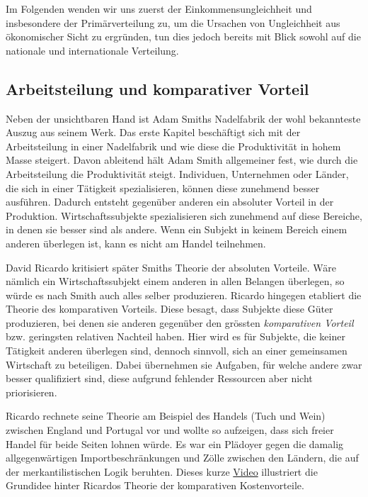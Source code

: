 \documentclass[
  nswissgerman,
  a4paper,
  DIV=11,
  numbers=noendperiod,
  oneside,
  openany]{scrreprt}
\begin{document}
Im Folgenden wenden wir uns zuerst der Einkommensungleichheit und
insbesondere der Primärverteilung zu, um die Ursachen von Ungleichheit
aus ökonomischer Sicht zu ergründen, tun dies jedoch bereits mit Blick
sowohl auf die nationale und internationale Verteilung.

\subsection{Arbeitsteilung und komparativer
Vorteil}\label{arbeitsteilung-und-komparativer-vorteil}

Neben der unsichtbaren Hand ist Adam Smiths Nadelfabrik der wohl
bekannteste Auszug aus seinem Werk. Das erste Kapitel beschäftigt sich
mit der Arbeitsteilung in einer Nadelfabrik und wie diese die
Produktivität in hohem Masse steigert. Davon ableitend hält Adam Smith
allgemeiner fest, wie durch die Arbeitsteilung die Produktivität steigt.
Individuen, Unternehmen oder Länder, die sich in einer Tätigkeit
spezialisieren, können diese zunehmend besser ausführen. Dadurch
entsteht gegenüber anderen ein absoluter Vorteil in der Produktion.
Wirtschaftssubjekte spezialisieren sich zunehmend auf diese Bereiche, in
denen sie besser sind als andere. Wenn ein Subjekt in keinem Bereich
einem anderen überlegen ist, kann es nicht am Handel teilnehmen.

David Ricardo kritisiert später Smiths Theorie der absoluten Vorteile.
Wäre nämlich ein Wirtschaftssubjekt einem anderen in allen Belangen
überlegen, so würde es nach Smith auch alles selber produzieren. Ricardo
hingegen etabliert die Theorie des komparativen Vorteils. Diese besagt,
dass Subjekte diese Güter produzieren, bei denen sie anderen gegenüber
den grössten \emph{komparativen Vorteil} bzw. geringsten relativen
Nachteil haben. Hier wird es für Subjekte, die keiner Tätigkeit anderen
überlegen sind, dennoch sinnvoll, sich an einer gemeinsamen Wirtschaft
zu beteiligen. Dabei übernehmen sie Aufgaben, für welche andere zwar
besser qualifiziert sind, diese aufgrund fehlender Ressourcen aber nicht
priorisieren.

Ricardo rechnete seine Theorie am Beispiel des Handels (Tuch und Wein)
zwischen England und Portugal vor und wollte so aufzeigen, dass sich
freier Handel für beide Seiten lohnen würde. Es war ein Plädoyer gegen
die damalig allgegenwärtigen Importbeschränkungen und Zölle zwischen den
Ländern, die auf der merkantilistischen Logik beruhten. Dieses kurze
\href{https://www.srf.ch/play/tv/eco/video/komparativer-kostenvorteil?urn=urn:srf:video:ff4bef24-b498-42cc-8d98-25353e7a1f71}{Video}
illustriert die Grundidee hinter Ricardos Theorie der komparativen
Kostenvorteile.
\end{document}
